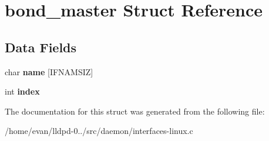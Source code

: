 \section{bond\-\_\-master \-Struct \-Reference}
\label{structbond__master}
\subsection*{\-Data \-Fields}
\begin{DoxyCompactItemize}
\item 
char {\bfseries name} [\-I\-F\-N\-A\-M\-S\-I\-Z]\label{structbond__master_a9ea12d6fc5b2c586092468ee1a86162a}

\item 
int {\bfseries index}\label{structbond__master_a750b5d744c39a06bfb13e6eb010e35d0}

\end{DoxyCompactItemize}


\-The documentation for this struct was generated from the following file\-:\begin{DoxyCompactItemize}
\item 
/home/evan/lldpd-\/0../src/daemon/interfaces-\/linux.\-c\end{DoxyCompactItemize}
